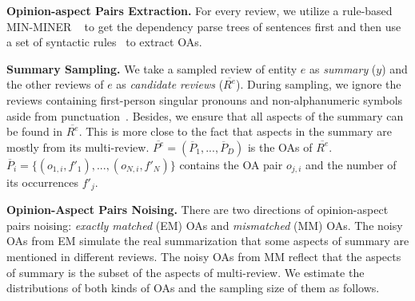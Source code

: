 {\textbf{Opinion-aspect Pairs Extraction.} 
For every review, we utilize a rule-based MIN-MINER ~\cite{basicOpiMin20} to get the dependency parse trees of sentences first and then use a set of syntactic rules~\cite{aspect12} to extract OAs.

\textbf{Summary Sampling.} 
We take a sampled review of entity $e$ as {\em summary} ($y$) and the other reviews of $e$ as {\em candidate reviews} ($\overline{R^e}$).
During sampling, we ignore the reviews containing first-person singular pronouns
and non-alphanumeric symbols aside from punctuation~\cite{Denoise20}.
Besides, 
we ensure that 
all aspects of the summary 
can be found in $\overline{R^e}$.
This is more close to the fact that aspects in the summary are mostly
from its multi-review.
$\overline{P^e}=(\overline{P}_{1},...,\overline{P}_{D})$ is the OAs of $\overline{R^e}$.
$\overline{P}_{i}=\{(o_{1,i},f'_1), ..., (o_{N, i},f'_{N})\}$ contains
the OA pair $o_{j,i}$ and the number of its occurrences $f'_j$.

\textbf{Opinion-Aspect Pairs Noising.}
There are two directions of opinion-aspect pairs noising: 
{\em exactly matched} (EM) OAs and {\em mismatched} (MM) OAs.
The noisy OAs from EM simulate the real summarization that
some aspects of summary are mentioned in different reviews.
The noisy OAs from MM reflect that the aspects of summary is the subset 
of the aspects of multi-review. We estimate the distributions of 
both kinds of OAs and the sampling size of them as follows.


}
